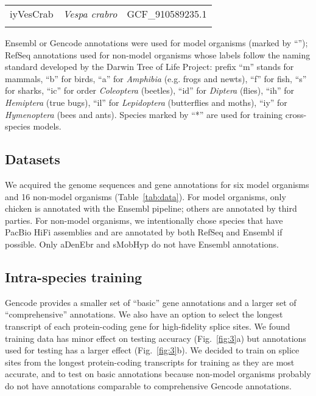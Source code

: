 \documentclass[webpdf,contemporary,large,namedate]{oup-authoring-template}%
\begin{document}
\begin{table}[!tb]
\begin{tabular*}{\columnwidth}{@{\extracolsep\fill}lll@{\extracolsep\fill}}
iyVesCrab      & \emph{Vespa crabro}               & GCF\_910589235.1 \\
\botrule
\end{tabular*}
\begin{tablenotes}\setlength\itemsep{0.0em}
Ensembl or Gencode annotations were used for model organisms (marked by ``\dag'');
RefSeq annotations used for non-model organisms whose labels
follow the naming standard developed by the Darwin Tree of Life Project:
prefix ``m'' stands for mammals,
``b'' for birds,
``a'' for \emph{Amphibia} (e.g. frogs and newts),
``f'' for fish,
``s'' for sharks,
``ic'' for order \emph{Coleoptera} (beetles),
``id'' for \emph{Diptera} (flies),
``ih'' for \emph{Hemiptera} (true bugs),
``il'' for \emph{Lepidoptera} (butterflies and moths),
``iy'' for \emph{Hymenoptera} (bees and ants).
Species marked by ``*'' are used for training cross-species models.
\end{tablenotes}
\end{table}

\subsection{Datasets}

We acquired the genome sequences and gene annotations for six model organisms and 16 non-model organisms (Table~\ref{tab:data}).
For model organisms, only chicken is annotated with the Ensembl pipeline;
others are annotated by third parties.
For non-model organisms, we intentionally chose species that have PacBio HiFi assemblies
and are annotated by both RefSeq and Ensembl if possible.
Only aDenEbr and sMobHyp do not have Ensembl annotations.

\subsection{Intra-species training}

Gencode provides a smaller set of ``basic'' gene annotations and a larger set of ``comprehensive'' annotations.
We also have an option to select the longest transcript of each protein-coding gene for high-fidelity splice sites.
We found training data has minor effect on testing accuracy (Fig.~\ref{fig:3}a)
but annotations used for testing has a larger effect (Fig.~\ref{fig:3}b).
We decided to train on splice sites from the longest protein-coding transcripts for training as they are most accurate,
and to test on basic annotations because non-model organisms probably do not have annotations comparable to comprehensive Gencode annotations.
\end{document}
